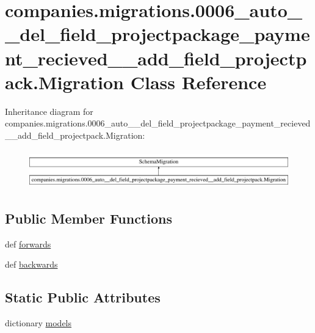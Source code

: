 \hypertarget{classcompanies_1_1migrations_1_10006__auto____del__field__projectpackage__payment__recieved____a718d6be8a503b6c2d4c720ce698bce11}{\section{companies.\-migrations.0006\-\_\-auto\-\_\-\-\_\-del\-\_\-field\-\_\-projectpackage\-\_\-payment\-\_\-recieved\-\_\-\-\_\-add\-\_\-field\-\_\-projectpack.Migration Class Reference}
\label{classcompanies_1_1migrations_1_10006__auto____del__field__projectpackage__payment__recieved____a718d6be8a503b6c2d4c720ce698bce11}
}
Inheritance diagram for companies.\-migrations.0006\-\_\-auto\-\_\-\-\_\-del\-\_\-field\-\_\-projectpackage\-\_\-payment\-\_\-recieved\-\_\-\-\_\-add\-\_\-field\-\_\-projectpack.Migration\-:\begin{figure}[H]
\begin{center}
\leavevmode
\includegraphics[height=1.679160cm]{classcompanies_1_1migrations_1_10006__auto____del__field__projectpackage__payment__recieved____a718d6be8a503b6c2d4c720ce698bce11}
\end{center}
\end{figure}
\subsection*{Public Member Functions}
\begin{DoxyCompactItemize}
\item 
def \hyperlink{classcompanies_1_1migrations_1_10006__auto____del__field__projectpackage__payment__recieved____a718d6be8a503b6c2d4c720ce698bce11_a2721389ace5298ee02526df430a8a7f1}{forwards}
\item 
def \hyperlink{classcompanies_1_1migrations_1_10006__auto____del__field__projectpackage__payment__recieved____a718d6be8a503b6c2d4c720ce698bce11_af66571a16bb7d52139199d3fcd11a451}{backwards}
\end{DoxyCompactItemize}
\subsection*{Static Public Attributes}
\begin{DoxyCompactItemize}
\item 
dictionary \hyperlink{classcompanies_1_1migrations_1_10006__auto____del__field__projectpackage__payment__recieved____a718d6be8a503b6c2d4c720ce698bce11_a550d12f01449626fda040f04049805cf}{models}
\end{DoxyCompactItemize}


